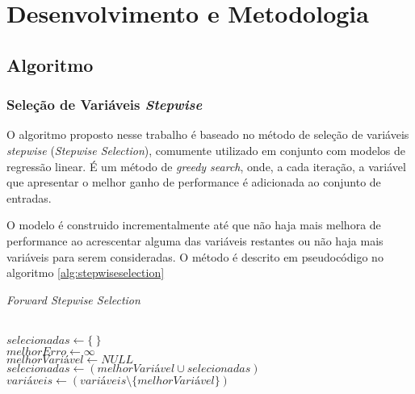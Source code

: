 \chapter[Desenvolvimento e Metodologia]{Desenvolvimento e Metodologia}

\section{Algoritmo}

\subsection{Seleção de Variáveis \textit{Stepwise}}

O algoritmo proposto nesse trabalho é baseado no método de seleção de variáveis \textit{stepwise} 
(\textit{Stepwise Selection}), comumente utilizado em conjunto com modelos de regressão linear. É um método de
\textit{greedy search}, onde, a cada iteração, a variável que apresentar o melhor ganho de performance é 
adicionada ao conjunto de entradas. 

O modelo é construido incrementalmente até que não haja mais melhora de performance ao acrescentar alguma das 
variáveis restantes ou não haja mais variáveis para serem consideradas. O método é descrito em pseudocódigo no 
algoritmo \ref{alg:stepwiseselection}

\begin{algorithm}
    \caption{\textit{Forward Stepwise Selection}}
    \ \\
    $selecionadas \gets \{\ \}$ \\
    $melhorErro \gets \infty$ \\
    {   
        $melhorVariável \gets NULL$ \\     
        $selecionadas \gets (melhorVariável \cup selecionadas)$ \\
        $variáveis \gets (variáveis \setminus \{melhorVariável\})$ \\
    }
    \label{alg:stepwiseselection}
\end{algorithm}

